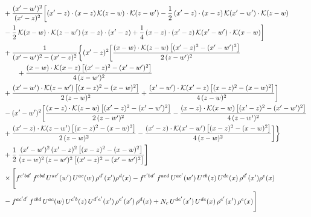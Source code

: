 \begin{align}
&+\frac{(x^{\prime}-w^{\prime})^{2}}{(x^{\prime}-z)^{2}}\bigg[(x^{\prime}-z)\cdot(x-z)\,\mathcal{K}(z-w)\cdot\mathcal{K}(z-w^{\prime})-\frac{1}{2}\,(x^{\prime}-z)\cdot(x-z)\,\mathcal{K}(x^{\prime}-w^{\prime})\cdot\mathcal{K}(z-w)\notag \\ & -\frac{1}{2}\,\mathcal{K}(x-w)\cdot\mathcal{K}(z-w^{\prime})\,(x-z)\cdot(x^{\prime}-z)+\frac{1}{4}\,(x-z)\cdot(x^{\prime}-z)\,\mathcal{K}(x^{\prime}-w^{\prime})\cdot\mathcal{K}(x-w)\bigg]\notag\\
&+\frac{1}{(x^{\prime}-w^{\prime})^{2}-(x^{\prime}-z)^{2}}\bigg\{(x^{\prime}-z)^{2}\bigg[\frac{(x-w)\cdot\mathcal{K}(z-w)\,\big[(x^{\prime}-z)^{2}-(x^{\prime}-w^{\prime})^{2}\big]}{2\,(z-w^{\prime})^{2}}\notag\\ &\qquad+\frac{(x-w)\cdot\mathcal{K}(x-z)\,\big[(x^{\prime}-z)^{2}-(x^{\prime}-w^{\prime})^{2}\big]}{4\,(z-w^{\prime})^{2}}\notag \\ & +\frac{(x^{\prime}-w^{\prime})\cdot\mathcal{K}(z-w^{\prime})\,\big[(x-z)^{2}-(x-w)^{2}\big]}{2\,(z-w)^{2}}+\frac{(x^{\prime}-w^{\prime})\cdot\mathcal{K}(x^{\prime}-z)\,\big[(x-z)^{2}-(x-w)^{2}\big]}{4\,(z-w)^{2}}\bigg]\notag\\
&-(x^{\prime}-w^{\prime})^{2}\bigg[\frac{(x-z)\cdot\mathcal{K}(z-w)\,\big[(x^{\prime}-z)^{2}-(x^{\prime}-w^{\prime})^{2}\big]}{2\,(z-w^{\prime})^{2}}-\frac{(x-z)\cdot\mathcal{K}(x-w)\,\big[(x^{\prime}-z)^{2}-(x^{\prime}-w^{\prime})^{2}\big]}{4\,(z-w^{\prime})^{2}}\notag \\ & +\frac{(x^{\prime}-z)\cdot\mathcal{K}(z-w^{\prime})\,\big[(x-z)^{2}-(x-w)^{2}\big]}{2\,(z-w)^{2}}-\frac{(x^{\prime}-z)\cdot\mathcal{K}(x^{\prime}-w^{\prime})\,\big[(x-z)^{2}-(x-w)^{2}\big]}{4\,(z-w)^{2}}\bigg]\bigg\}\notag\\
&+\frac{1}{2}\,\frac{(x^{\prime}-w^{\prime})^{2}\,(x^{\prime}-z)^{2}\,\big[(x-z)^{2}-(x-w)^{2}\big]}{(z-w)^{2}\,(z-w^{\prime})^{2}\,\big[(x^{\prime}-z)^{2}-(x^{\prime}-w^{\prime})^{2}\big]}\Bigg]\notag\\
&\times\Bigg[f^{c^{\prime}bd^{\prime}}\,f^{cbd}\, U^{ac^{\prime}}(w^{\prime})\,U^{ac}(w)\,\rho^{d^{\prime}}(x^{\prime})\rho^{d}(x)- f^{c^{\prime}bd^{\prime}}\,f^{acd}\,U^{ac^{\prime}}(w^{\prime})\,U^{cb}(z)\,U^{de}(x)\,\rho^{d^{\prime}}(x^{\prime})\rho^{e}(x) \notag \\ & -f^{ac^{\prime}d^{\prime}}\,f^{cbd}\,U^{ac}(w)\,U^{c^{\prime}b}(z)\,U^{d^{\prime}e^{\prime}}(x^{\prime})\,\rho^{e^{\prime}}(x^{\prime})\,\rho^{d}(x) +N_{c}\,U^{de^{\prime}}(x^{\prime})\,U^{de}(x)\,\rho^{e^{\prime}}(x^{\prime})\,\rho^{e}(x)\Bigg]\\

\end{align}
